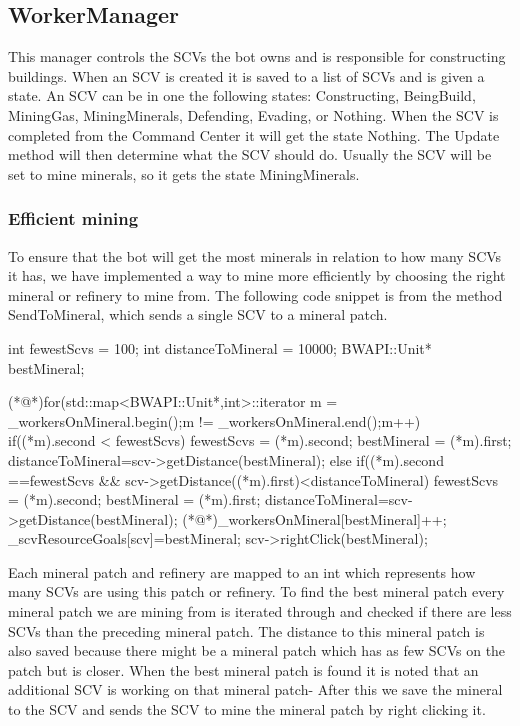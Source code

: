 	\subsection{WorkerManager}
		This manager controls the SCVs the bot owns and is responsible for constructing buildings. When an SCV is created it is saved to a list of 
		SCVs and is given a state. An SCV can be in one the following states: Constructing, BeingBuild, MiningGas, MiningMinerals, Defending, Evading, or Nothing. When 
		the SCV is completed from the Command Center it will get the state Nothing. The Update method will then determine what the SCV should do. Usually 
		the SCV will be set to mine minerals, so it gets the state MiningMinerals. 
		\subsubsection*{Efficient mining}
			To ensure that the bot will get the most minerals in relation to how many SCVs it has, we have implemented a way to mine more efficiently by choosing the right mineral or refinery to mine from. The following code snippet is from the method SendToMineral, which sends a single SCV
			to a mineral patch.
			
				\begin{Sourcecode}[caption=SendToMineral method]
	int fewestScvs = 100;
	int distanceToMineral = 10000;
	BWAPI::Unit* bestMineral;

	(*@\lnote@*)for(std::map<BWAPI::Unit*,int>::iterator m = _workersOnMineral.begin();m != _workersOnMineral.end();m++)
	{
		if((*m).second < fewestScvs)
		{
			fewestScvs = (*m).second;
			bestMineral = (*m).first;
			distanceToMineral=scv->getDistance(bestMineral);
		}
		else if((*m).second ==fewestScvs && scv->getDistance((*m).first)<distanceToMineral)
		{
			fewestScvs = (*m).second;
			bestMineral = (*m).first;
			distanceToMineral=scv->getDistance(bestMineral);
		}
	}
	(*@\lnote@*)_workersOnMineral[bestMineral]++;
	_scvResourceGoals[scv]=bestMineral;
	scv->rightClick(bestMineral);
				\end{Sourcecode}
			Each mineral patch and refinery are mapped to an int which represents how many SCVs are using this patch or refinery. To find the best mineral 
			patch every mineral patch we are mining from is iterated through  and checked if there are less SCVs than the preceding mineral patch. 
			The distance to this mineral patch is also saved because there might be a mineral patch which has as few SCVs on the patch but is closer. 
			When the best mineral patch is found it is noted that an additional SCV is working on that mineral patch- After this we save the 
			mineral to the SCV and sends the SCV to mine the mineral patch by right clicking it.
			
